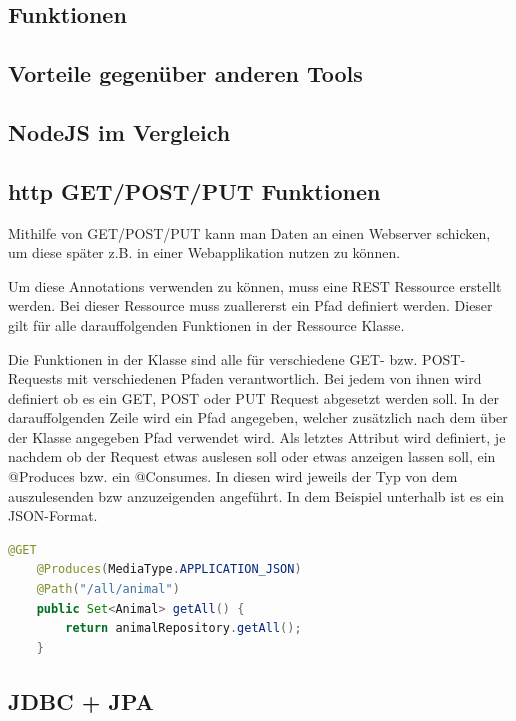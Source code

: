 \subsection{Funktionen}
\subsection{Vorteile gegenüber anderen Tools}

\subsection{NodeJS im Vergleich}
\subsection{http GET/POST/PUT Funktionen}
Mithilfe von GET/POST/PUT kann man Daten an einen Webserver schicken, um diese später z.B. in einer Webapplikation nutzen zu können.

Um diese Annotations verwenden zu können, muss eine REST Ressource erstellt werden.
Bei dieser Ressource muss zuallererst ein Pfad definiert werden. Dieser gilt für alle darauffolgenden Funktionen in der Ressource Klasse.

Die Funktionen in der Klasse sind alle für verschiedene GET- bzw. POST-Requests mit verschiedenen Pfaden verantwortlich. Bei jedem von ihnen wird definiert ob es ein GET, POST oder PUT Request abgesetzt werden soll. In der darauffolgenden Zeile wird ein Pfad angegeben, welcher zusätzlich nach dem über der Klasse angegeben Pfad verwendet wird. Als letztes Attribut wird definiert, je nachdem ob der Request etwas auslesen soll oder etwas anzeigen lassen soll, ein @Produces bzw. ein @Consumes. In diesen wird jeweils der Typ von dem auszulesenden bzw anzuzeigenden angeführt. In dem Beispiel unterhalb ist es ein JSON-Format.

\begin{lstlisting}[language=java,caption=Quarkus POST-Request,label=lst:impl:canvasJSchartOptions]
    @GET
    @Produces(MediaType.APPLICATION_JSON)
    @Path("/all/animal")
    public Set<Animal> getAll() {
        return animalRepository.getAll();
    }
  \end{lstlisting}

\subsection{JDBC + JPA}
